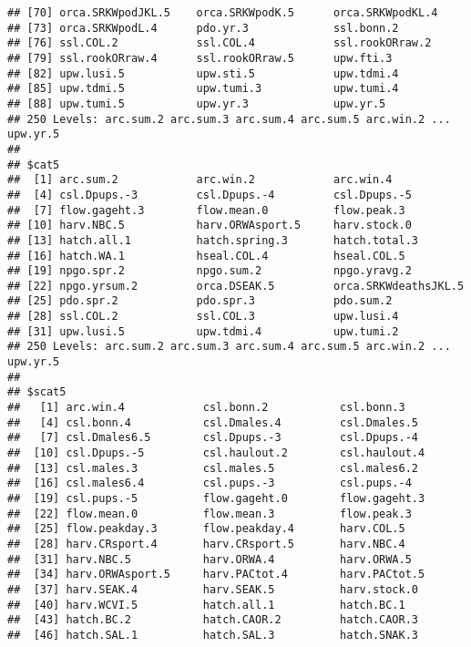 \documentclass[]{article}
\begin{document}
\begin{verbatim}
## [70] orca.SRKWpodJKL.5    orca.SRKWpodK.5      orca.SRKWpodKL.4    
## [73] orca.SRKWpodL.4      pdo.yr.3             ssl.bonn.2          
## [76] ssl.COL.2            ssl.COL.4            ssl.rookORraw.2     
## [79] ssl.rookORraw.4      ssl.rookORraw.5      upw.fti.3           
## [82] upw.lusi.5           upw.sti.5            upw.tdmi.4          
## [85] upw.tdmi.5           upw.tumi.3           upw.tumi.4          
## [88] upw.tumi.5           upw.yr.3             upw.yr.5            
## 250 Levels: arc.sum.2 arc.sum.3 arc.sum.4 arc.sum.5 arc.win.2 ... upw.yr.5
## 
## $cat5
##  [1] arc.sum.2            arc.win.2            arc.win.4           
##  [4] csl.Dpups.-3         csl.Dpups.-4         csl.Dpups.-5        
##  [7] flow.gageht.3        flow.mean.0          flow.peak.3         
## [10] harv.NBC.5           harv.ORWAsport.5     harv.stock.0        
## [13] hatch.all.1          hatch.spring.3       hatch.total.3       
## [16] hatch.WA.1           hseal.COL.4          hseal.COL.5         
## [19] npgo.spr.2           npgo.sum.2           npgo.yravg.2        
## [22] npgo.yrsum.2         orca.DSEAK.5         orca.SRKWdeathsJKL.5
## [25] pdo.spr.2            pdo.spr.3            pdo.sum.2           
## [28] ssl.COL.2            ssl.COL.3            upw.lusi.4          
## [31] upw.lusi.5           upw.tdmi.4           upw.tumi.2          
## 250 Levels: arc.sum.2 arc.sum.3 arc.sum.4 arc.sum.5 arc.win.2 ... upw.yr.5
## 
## $scat5
##   [1] arc.win.4            csl.bonn.2           csl.bonn.3          
##   [4] csl.bonn.4           csl.Dmales.4         csl.Dmales.5        
##   [7] csl.Dmales6.5        csl.Dpups.-3         csl.Dpups.-4        
##  [10] csl.Dpups.-5         csl.haulout.2        csl.haulout.4       
##  [13] csl.males.3          csl.males.5          csl.males6.2        
##  [16] csl.males6.4         csl.pups.-3          csl.pups.-4         
##  [19] csl.pups.-5          flow.gageht.0        flow.gageht.3       
##  [22] flow.mean.0          flow.mean.3          flow.peak.3         
##  [25] flow.peakday.3       flow.peakday.4       harv.COL.5          
##  [28] harv.CRsport.4       harv.CRsport.5       harv.NBC.4          
##  [31] harv.NBC.5           harv.ORWA.4          harv.ORWA.5         
##  [34] harv.ORWAsport.5     harv.PACtot.4        harv.PACtot.5       
##  [37] harv.SEAK.4          harv.SEAK.5          harv.stock.0        
##  [40] harv.WCVI.5          hatch.all.1          hatch.BC.1          
##  [43] hatch.BC.2           hatch.CAOR.2         hatch.CAOR.3        
##  [46] hatch.SAL.1          hatch.SAL.3          hatch.SNAK.3        

\end{verbatim}
\end{document}
